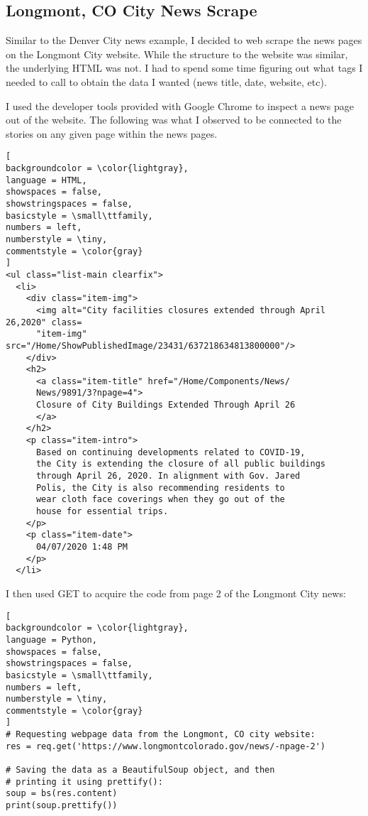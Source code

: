 \documentclass[]{article}
\begin{document}
\subsection{Longmont, CO City News Scrape}
Similar to the Denver City news example, I decided to web scrape the news pages on the Longmont City website.  While the structure to the website was similar, the underlying HTML was not.  I had to spend some time figuring out what tags I needed to call to obtain the data I wanted (news title, date, website, etc).

I used the developer tools provided with Google Chrome to inspect a news page out of the website.  The following was what I observed to be connected to the stories on any given page within the news pages.


\begin{lstlisting}[
backgroundcolor = \color{lightgray},
language = HTML,
showspaces = false,
showstringspaces = false,
basicstyle = \small\ttfamily,
numbers = left,
numberstyle = \tiny,
commentstyle = \color{gray}
]
<ul class="list-main clearfix">
  <li>
    <div class="item-img">
      <img alt="City facilities closures extended through April 26,2020" class=
      "item-img" src="/Home/ShowPublishedImage/23431/637218634813800000"/>
    </div>
    <h2>
      <a class="item-title" href="/Home/Components/News/
      News/9891/3?npage=4">
      Closure of City Buildings Extended Through April 26
      </a>
	</h2>
	<p class="item-intro">
	  Based on continuing developments related to COVID-19, 
	  the City is extending the closure of all public buildings
	  through April 26, 2020. In alignment with Gov. Jared
	  Polis, the City is also recommending residents to 
	  wear cloth face coverings when they go out of the 
	  house for essential trips.
	</p>
	<p class="item-date">
	  04/07/2020 1:48 PM
	</p>
  </li>
\end{lstlisting}
I then used GET to acquire the code from page 2 of the Longmont City news:
\begin{lstlisting}[
backgroundcolor = \color{lightgray},
language = Python,
showspaces = false,
showstringspaces = false,
basicstyle = \small\ttfamily,
numbers = left,
numberstyle = \tiny,
commentstyle = \color{gray}
]
# Requesting webpage data from the Longmont, CO city website:
res = req.get('https://www.longmontcolorado.gov/news/-npage-2')

# Saving the data as a BeautifulSoup object, and then
# printing it using prettify():
soup = bs(res.content)
print(soup.prettify())
\end{lstlisting}
\end{document}
